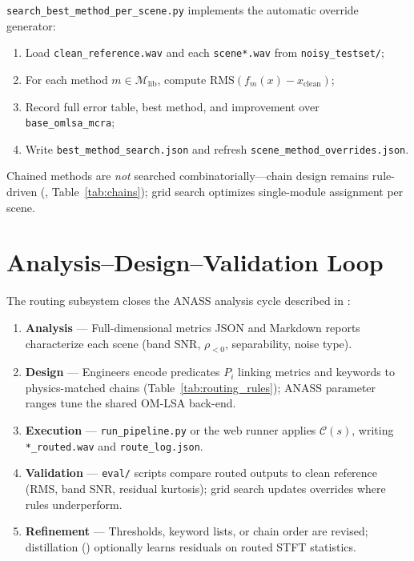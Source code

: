 \texttt{search\_best\_method\_per\_scene.py} implements the automatic override generator:
\begin{enumerate}
  \item Load \texttt{clean\_reference.wav} and each \texttt{scene*.wav} from \texttt{noisy\_testset/};
  \item For each method $m\in\mathcal{M}_{\mathrm{lib}}$, compute $\mathrm{RMS}(f_m(x)-x_{\mathrm{clean}})$;
  \item Record full error table, best method, and improvement over \texttt{base\_omlsa\_mcra};
  \item Write \texttt{best\_method\_search.json} and refresh \texttt{scene\_method\_overrides.json}.
\end{enumerate}
Chained methods are \emph{not} searched combinatorially---chain design remains rule-driven (, Table~\ref{tab:chains}); grid search optimizes single-module assignment per scene.

\section{Analysis--Design--Validation Loop}
\label{sec:ad_loop}

The routing subsystem closes the ANASS analysis cycle described in :

\begin{enumerate}
  \item \textbf{Analysis} --- Full-dimensional metrics JSON and Markdown reports characterize each scene (band SNR, $\rho_{<0}$, separability, noise type).
  \item \textbf{Design} --- Engineers encode predicates $P_i$ linking metrics and keywords to physics-matched chains (Table~\ref{tab:routing_rules}); ANASS parameter ranges tune the shared OM-LSA back-end.
  \item \textbf{Execution} --- \texttt{run\_pipeline.py} or the web runner applies $\mathcal{C}(s)$, writing \texttt{*\_routed.wav} and \texttt{route\_log.json}.
  \item \textbf{Validation} --- \texttt{eval/} scripts compare routed outputs to clean reference (RMS, band SNR, residual kurtosis); grid search updates overrides where rules underperform.
  \item \textbf{Refinement} --- Thresholds, keyword lists, or chain order are revised; distillation () optionally learns residuals on routed STFT statistics.
\end{enumerate}

